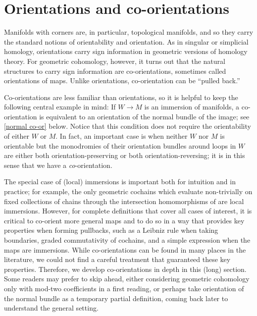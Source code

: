 


\section{Orientations and co-orientations}\label{S: orientations and co-orientations}

Manifolds with corners are, in particular, topological manifolds, and so they carry the standard notions of orientability and orientation. As in singular or simplicial homology, orientations carry sign information in geometric versions of homology theory. For geometric cohomology, however, it turns out that the natural structures to carry sign information are co-orientations, sometimes called orientations of maps. Unlike orientations, co-orientation can be ``pulled back.''

Co-orientations are less familiar than orientations, so it is helpful to keep the following central example in mind: If $W\to M$ is an  immersion of manifolds, a co-orientation is equivalent to an
orientation of the normal bundle of the image; see \cref{normal co-or} below. Notice that this condition does not require the orientability of either $W$ or $M$. In fact, an important case is when neither $W$ nor $M$ is orientable but the monodromies of their orientation bundles around loops in $W$ are either both orientation-preserving or both orientation-reversing; it is in this sense that we have a {\it co}-orientation.

The special case of (local) immersions is important both for intuition and in practice; for example, the only geometric cochains which evaluate non-trivially on fixed collections of chains through the intersection homomorphisms of \cite{FMS-flows} are local immersions.  However, for complete definitions that cover all cases of  interest, it is critical to co-orient more general maps and to do so in a way that provides key properties when forming pullbacks, such as a Leibniz rule when taking boundaries, graded commutativity of cochains, and a simple expression when the maps are immersions.
While co-orientations can be found in many places in the literature, we could not find a careful treatment that guaranteed these key properties. Therefore, we develop co-orientations in depth in this (long) section.
Some readers may prefer to skip ahead, either considering geometric cohomology only with mod-two coefficients in a first reading, or perhaps take orientation of the normal bundle as a temporary partial definition, coming back later to understand the general setting.


